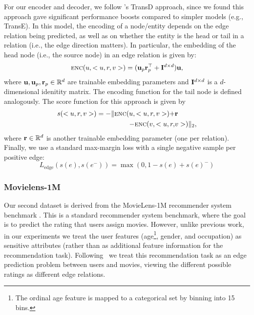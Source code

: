 For our encoder and decoder, we follow \citet{ji2015knowledge}'s TransD approach, since we found this approach gave significant performance boosts compared to simpler models (e.g., TransE). 
In this model, the encoding of a node/entity depends on the edge relation being predicted, as well as on whether the entity is the head or tail in a relation (i.e., the edge direction matters).
In particular, the embedding of the head node (i.e., the source node) in an edge relation is given by:
\begin{equation}
    \textsc{enc}(u, <u, r, v>) = (\mathbf{u}_p\mathbf{r}_p^\top + \mathbf{I}^{d \times d})\mathbf{u},
\end{equation}
where $\mathbf{u}, \mathbf{u}_p, \mathbf{r}_p \in \mathbb{R}^d$ are trainable embedding parameters and $\mathbf{I}^{d\times d}$ is a $d$-dimensional idenitity matrix. 
The encoding function for the tail node is defined analogously. 
The score function for this approach is given by
\begin{align*}\label{eq:transd}
s(<u, r, v>) = -\|\textsc{enc}(u, <u, r, v>) + &\mathbf{r} \\ - \textsc{enc}(v, <u, r,& v>)\|_2,
\end{align*}
where $\mathbf{r} \in \mathbb{R}^d$ is another trainable embedding parameter (one per relation). 
Finally, we use a standard max-margin loss with a single negative sample per positive edge:
\begin{equation}\label{eq:margin}
    L_{\textrm{edge}}(s(e), s(e^-)) = \max(0, 1 - s(e) + s(e)^-)
\end{equation}


\subsubsection{Movielens-1M}

Our second dataset is derived from the MovieLens-1M recommender system benchmark \CITE.
This is a standard recommender system benchmark, where the goal is to predict the rating that users assign movies.
However, unlike previous work, in our experiments we treat the user features (age\footnote{The ordinal age feature is mapped  to a categorical set by binning into 15 bins.}, gender, and occupation) as sensitive attributes (rather than as additional feature information for the recommendation task). 
Following \CITE\, we treat this recommendation task as an edge prediction problem between users and movies, viewing the different possible ratings as different edge relations. 

